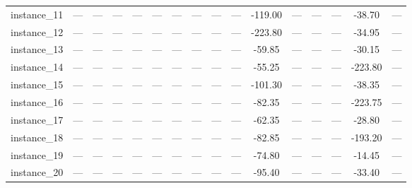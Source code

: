 \documentclass[sigconf]{acmart}
\begin{document}
\begin{table}[htbp]
\begin{tabular}{l ccccccc cccc cccc}
  instance\_11 & --- & --- & --- & --- & --- & --- & --- & --- & --- & -119.00 & --- & --- & --- & -38.70 & --- \\
  instance\_12 & --- & --- & --- & --- & --- & --- & --- & --- & --- & -223.80 & --- & --- & --- & -34.95 & --- \\
  instance\_13 & --- & --- & --- & --- & --- & --- & --- & --- & --- & -59.85 & --- & --- & --- & -30.15 & --- \\
  instance\_14 & --- & --- & --- & --- & --- & --- & --- & --- & --- & -55.25 & --- & --- & --- & -223.80 & --- \\
  instance\_15 & --- & --- & --- & --- & --- & --- & --- & --- & --- & -101.30 & --- & --- & --- & -38.35 & --- \\
  instance\_16 & --- & --- & --- & --- & --- & --- & --- & --- & --- & -82.35 & --- & --- & --- & -223.75 & --- \\
  instance\_17 & --- & --- & --- & --- & --- & --- & --- & --- & --- & -62.35 & --- & --- & --- & -28.80 & --- \\
  instance\_18 & --- & --- & --- & --- & --- & --- & --- & --- & --- & -82.85 & --- & --- & --- & -193.20 & --- \\
  instance\_19 & --- & --- & --- & --- & --- & --- & --- & --- & --- & -74.80 & --- & --- & --- & -14.45 & --- \\
  instance\_20 & --- & --- & --- & --- & --- & --- & --- & --- & --- & -95.40 & --- & --- & --- & -33.40 & --- \\
  \bottomrule
  \end{tabular}
  \end{table}  
\end{document}
